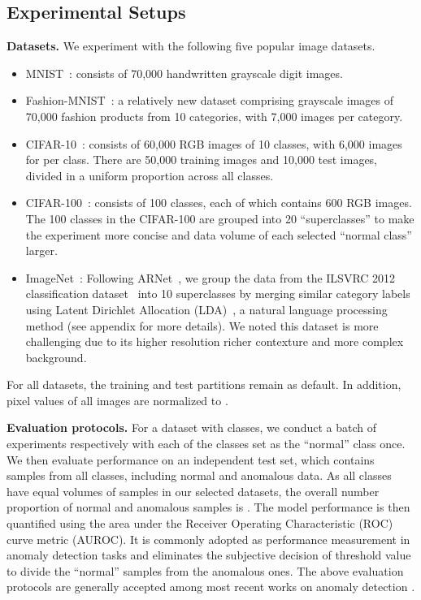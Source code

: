 \documentclass[journal]{IEEEtran}
\theoremstyle{remark}
\begin{document}
\subsection{Experimental Setups}

\textbf{Datasets.}
We experiment with the following five popular image datasets. 
\begin{itemize}
    \item
    MNIST~\cite{lecun1998mnist}: consists of 70,000  handwritten grayscale digit images.
    \item
    Fashion-MNIST~\cite{xiao2017fashion}: a relatively new dataset comprising  grayscale images of 70,000 fashion products from 10 categories, with 7,000 images per category. 
    \item CIFAR-10~\cite{krizhevsky2009learning}: consists of 60,000  RGB images of 10 classes, with 6,000 images for per class. There are 50,000 training images and 10,000 test images, divided in a uniform proportion across all classes. 
    \item
    CIFAR-100~\cite{krizhevsky2009learning}: consists of 100 classes, each of which contains 600 RGB images. The 100 classes in the CIFAR-100 are grouped into 20 ``superclasses'' to make the experiment more concise and data volume of each selected ``normal class'' larger. 
    \item
    ImageNet~\cite{russakovsky2015imagenet}: Following ARNet~\cite{fye2020ARNet}, we group the data from the ILSVRC 2012 classification dataset~\cite{russakovsky2015imagenet} into 10 superclasses by merging similar category labels using Latent Dirichlet Allocation (LDA)~\cite{blei2003latent}, a natural language processing method (see appendix for more details). We noted this dataset is more challenging due to its higher resolution richer contexture and more complex background. 
\end{itemize}
For all datasets, the training and test partitions remain as default. In addition, pixel values of all images are normalized to . 


\textbf{Evaluation protocols.} 
For a dataset with  classes, we conduct a batch of  experiments respectively with each of the  classes set as the ``normal'' class once. We then evaluate performance on an independent test set, which contains samples from all classes, including normal and anomalous data. As all classes have equal volumes of samples in our selected datasets, the overall number proportion of normal and anomalous samples is . The model performance is then quantified using the area under the Receiver Operating Characteristic (ROC) curve metric (AUROC). It is commonly adopted as performance measurement in anomaly detection tasks and eliminates the subjective decision of threshold value to divide the ``normal'' samples from the anomalous ones. The above evaluation protocols are generally accepted among most recent works on anomaly detection \cite{kingma2013auto, zhai2016deep, zong2018deep,schlegl2017unsupervised,Akcay2018,OCGAN,golan2018deep,deecke2018anomaly,fye2020ARNet}. 
\end{document}
